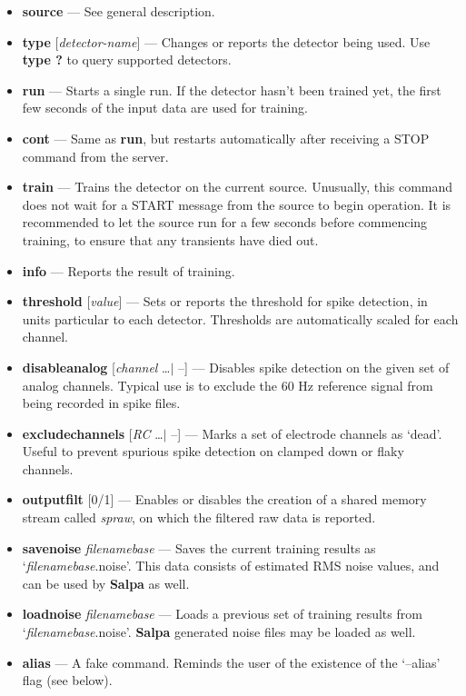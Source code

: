 \documentclass[12pt,oneside]{book}
\def\prog#1{{\bf #1}}
\def\cmd#1{{\bf #1}}
\def\arg#1{{\it #1}}
\def\stream#1{{\it #1}\xspace}
\begin{document}
\begin{itemize}
\item \cmd{source} --- See general description.
\item \cmd{type} [\arg{detector-name}] --- Changes or reports the detector
being used. Use \cmd{type ?} to query supported detectors.
\item \cmd{run} --- Starts a single run. If the detector hasn't been
trained yet, the first few seconds of the input data are used for training.
\item \cmd{cont} --- Same as \cmd{run}, but restarts automatically after
receiving a STOP command from the server.
\item \cmd{train} --- Trains the detector on the current source.
Unusually, this command does not wait for a START message from the
source to begin operation. It is recommended to let the source run for
a few seconds before commencing training, to ensure that any
transients have died out.
\item \cmd{info} --- Reports the result of training.
\item \cmd{threshold} [\arg{value}] --- Sets or reports the threshold for
spike detection, in units particular to each detector. Thresholds are
automatically scaled for each channel.
\item \cmd{disableanalog} [\arg{channel} \ldots $|$ --] --- Disables spike
detection on the given set of analog channels. Typical use is to
exclude the 60 Hz reference signal from being recorded in spike files.
\item \cmd{excludechannels} [\arg{RC} \ldots $|$ --] --- Marks a set of
electrode channels as `dead'. Useful to prevent spurious spike detection on
clamped down or flaky channels.
\item \cmd{outputfilt} [0/1] --- Enables or disables the creation of a
shared memory stream called \stream{spraw}, on which the filtered raw data is
reported.
\item \cmd{savenoise} \arg{filenamebase} --- Saves the current training results
as `{\it filenamebase}.noise'. This data consists of estimated RMS
noise values, and can be used by \prog{Salpa} as well.
\item \cmd{loadnoise} \arg{filenamebase} --- Loads a previous set of
training results from `{\it filenamebase}.noise'. \prog{Salpa}
generated noise files may be loaded as well.
\item \cmd{alias} --- A fake command. Reminds the user of the
existence of the `--alias' flag (see below).
\end{itemize}
\end{document}

